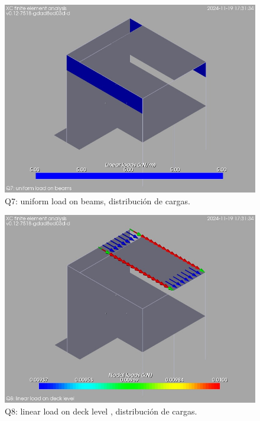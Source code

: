 \begin{figure}[ht]
\begin{center}
\includegraphics[width=\linewidth]{results/graphics/loads/qunifBeamsoverallSet}
\caption{Q7: uniform load on beams, distribución de cargas.}
\label{qunifBeamsoverallSet}
\end{center}
\end{figure}
\begin{figure}[ht]
\begin{center}
\includegraphics[width=\linewidth]{results/graphics/loads/qlinDeckoverallSet}
\caption{Q8: linear load on deck level , distribución de cargas.}
\label{qlinDeckoverallSet}
\end{center}
\end{figure}
